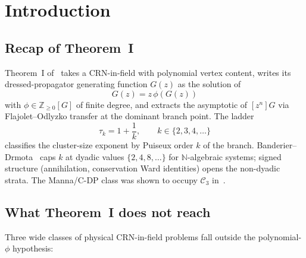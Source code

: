 \documentclass[11pt,a4paper]{article}
\newcommand{\Cstr}[1]{\mathcal{C}_{#1}}
\newcommand{\Z}{\mathbb{Z}}
\newcommand{\N}{\mathbb{N}}
\theoremstyle{plain}
\theoremstyle{definition}
\begin{document}
\tableofcontents

\section{Introduction}
\label{sec:intro}

\subsection{Recap of Theorem~I}

Theorem~I of~\citep{AmarteifioCFAC2026} takes a CRN-in-field with
polynomial vertex content, writes its dressed-propagator generating
function $G(z)$ as the solution of
\begin{equation}
\label{eq:DSE-I}
  G(z) = z\,\phi(G(z))
\end{equation}
with $\phi \in \Z_{\geq 0}[G]$ of finite degree, and extracts the
asymptotic of $[z^n] G$ via Flajolet--Odlyzko transfer at the
dominant branch point.  The ladder
\begin{equation}
\label{eq:tau-ladder}
  \tau_k = 1 + \frac{1}{k}, \qquad k \in \{2, 3, 4, \dots\}
\end{equation}
classifies the cluster-size exponent by Puiseux order $k$ of the
branch.  Banderier--Drmota~\citep{BanderierDrmota2015} caps $k$ at
dyadic values $\{2, 4, 8, \dots\}$ for $\N$-algebraic systems; signed
structure (annihilation, conservation Ward identities) opens the
non-dyadic strata.  The Manna/C-DP class was shown to occupy
$\Cstr{3}$ in~\citep{AmarteifioManna2026}.

\subsection{What Theorem~I does not reach}

Three wide classes of physical CRN-in-field problems fall outside
the polynomial-$\phi$ hypothesis:
\end{document}

